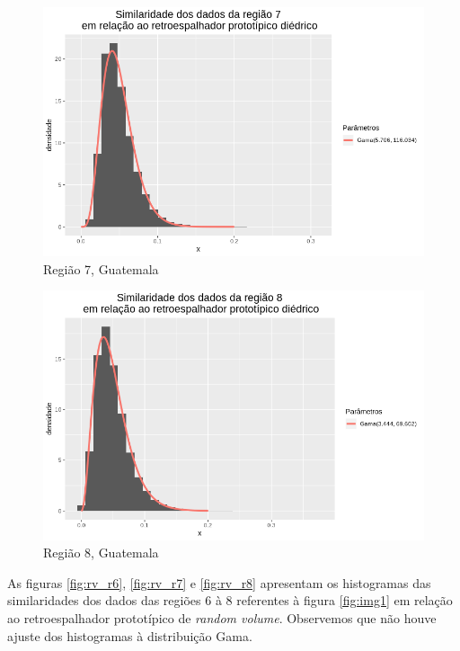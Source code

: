 \documentclass[12pt]{article}
\begin{document}
\begin{figure}[!h]
    \centering
    \vspace{0.05\linewidth}
    \includegraphics[width = 0.95\linewidth]{../../Images/Report_18_12_17/di_region7.png}
    \caption{Região 7, Guatemala}
    \label{fig:di_r7}
\end{figure}

\begin{figure}[!h]
    \centering    
    \includegraphics[width = 0.95\linewidth]{../../Images/Report_18_12_17/di_region8.png}
    \caption{Região 8, Guatemala}
    \label{fig:di_r8}
\end{figure}

As figuras \ref{fig:rv_r6}, \ref{fig:rv_r7} e \ref{fig:rv_r8} apresentam os histogramas das similaridades dos dados das regiões 6 à 8 referentes à figura \ref{fig:img1} em relação ao retroespalhador prototípico de \textit{random volume}. Observemos que não houve ajuste dos histogramas à distribuição Gama.
\end{document}
